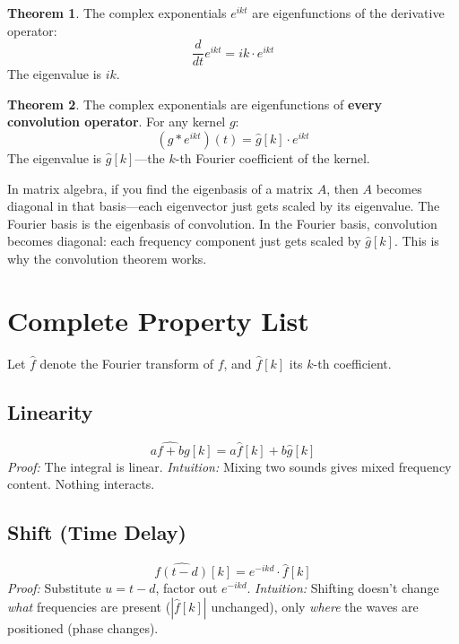 \documentclass[11pt,a4paper]{article}
\theoremstyle{definition}
\newtheorem{theorem}{Theorem}[section]
\begin{document}
\begin{theorem}
The complex exponentials $e^{ikt}$ are eigenfunctions of the derivative operator:
\begin{equation}
    \frac{d}{dt} e^{ikt} = ik \cdot e^{ikt}
\end{equation}
The eigenvalue is $ik$.
\end{theorem}

\begin{theorem}
The complex exponentials are eigenfunctions of \textbf{every convolution operator}. For any kernel $g$:
\begin{equation}
    (g * e^{ikt})(t) = \hat{g}[k] \cdot e^{ikt}
\end{equation}
The eigenvalue is $\hat{g}[k]$---the $k$-th Fourier coefficient of the kernel.
\end{theorem}

\begin{intuition}
In matrix algebra, if you find the eigenbasis of a matrix $A$, then $A$ becomes diagonal in that basis---each eigenvector just gets scaled by its eigenvalue. The Fourier basis is the eigenbasis of convolution. In the Fourier basis, convolution becomes diagonal: each frequency component just gets scaled by $\hat{g}[k]$. This is why the convolution theorem works.
\end{intuition}

\section{Complete Property List}

Let $\hat{f}$ denote the Fourier transform of $f$, and $\hat{f}[k]$ its $k$-th coefficient.

\subsection{Linearity}
\begin{equation}
    \widehat{af + bg}[k] = a\hat{f}[k] + b\hat{g}[k]
\end{equation}
\textit{Proof:} The integral is linear. \quad
\textit{Intuition:} Mixing two sounds gives mixed frequency content. Nothing interacts.

\subsection{Shift (Time Delay)}
\begin{equation}
    \widehat{f(t - d)}[k] = e^{-ikd} \cdot \hat{f}[k]
\end{equation}
\textit{Proof:} Substitute $u = t - d$, factor out $e^{-ikd}$. \quad
\textit{Intuition:} Shifting doesn't change \emph{what} frequencies are present ($|\hat{f}[k]|$ unchanged), only \emph{where} the waves are positioned (phase changes).
\end{document}
